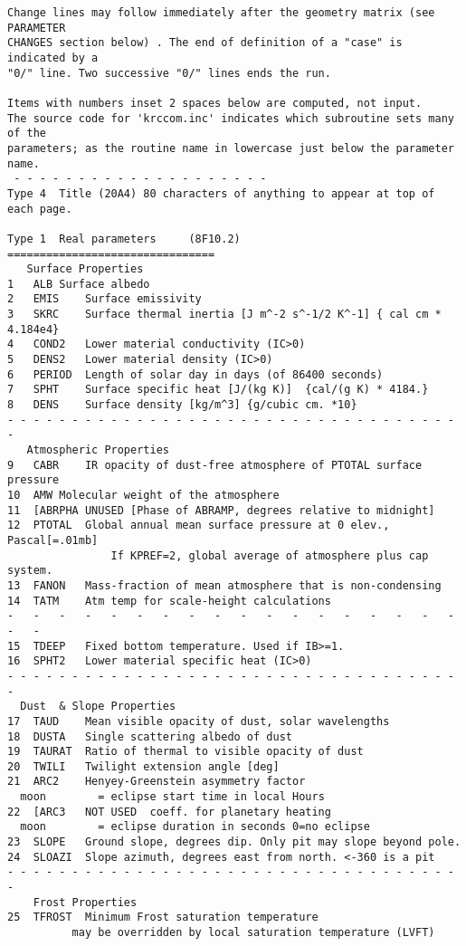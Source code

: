 \begin{verbatim}
Change lines may follow immediately after the geometry matrix (see PARAMETER
CHANGES section below) . The end of definition of a "case" is indicated by a
"0/" line. Two successive "0/" lines ends the run.

Items with numbers inset 2 spaces below are computed, not input.                
The source code for 'krccom.inc' indicates which subroutine sets many of the 
parameters; as the routine name in lowercase just below the parameter name.
 - - - - - - - - - - - - - - - - - - - -
Type 4	Title (20A4) 80 characters of anything to appear at top of each page.

Type 1	Real parameters 	(8F10.2)	================================
   Surface Properties
1	ALB	Surface albedo
2	EMIS	Surface emissivity
3	SKRC	Surface thermal inertia [J m^-2 s^-1/2 K^-1] { cal cm * 4.184e4}
4	COND2	Lower material conductivity (IC>0)
5	DENS2	Lower material density (IC>0)
6	PERIOD	Length of solar day in days (of 86400 seconds)
7	SPHT	Surface specific heat [J/(kg K)]  {cal/(g K) * 4184.}
8	DENS	Surface density [kg/m^3] {g/cubic cm. *10}
- - - - - - - - - - - - - - - - - - - - - - - - - - - - - - - - - - - - 
   Atmospheric Properties
9	CABR	IR opacity of dust-free atmosphere of PTOTAL surface pressure
10	AMW	Molecular weight of the atmosphere
11	[ABRPHA	UNUSED [Phase of ABRAMP, degrees relative to midnight] 
12	PTOTAL	Global annual mean surface pressure at 0 elev., Pascal[=.01mb]
                If KPREF=2, global average of atmosphere plus cap system.
13	FANON	Mass-fraction of mean atmosphere that is non-condensing
14	TATM	Atm temp for scale-height calculations
-   -   -   -   -   -   -   -   -   -   -   -   -   -   -   -   -   -   -   -   
15	TDEEP	Fixed bottom temperature. Used if IB>=1.
16	SPHT2	Lower material specific heat (IC>0)
- - - - - - - - - - - - - - - - - - - - - - - - - - - - - - - - - - - - 
  Dust  & Slope Properties
17	TAUD	Mean visible opacity of dust, solar wavelengths
18	DUSTA	Single scattering albedo of dust
19	TAURAT	Ratio of thermal to visible opacity of dust
20	TWILI	Twilight extension angle [deg]
21	ARC2	Henyey-Greenstein asymmetry factor
  moon        = eclipse start time in local Hours
22	[ARC3	NOT USED  coeff. for planetary heating 
  moon        = eclipse duration in seconds 0=no eclipse
23	SLOPE	Ground slope, degrees dip. Only pit may slope beyond pole.
24	SLOAZI	Slope azimuth, degrees east from north. <-360 is a pit
- - - - - - - - - - - - - - - - - - - - - - - - - - - - - - - - - - - - 
    Frost Properties
25	TFROST	Minimum Frost saturation temperature
		  may be overridden by local saturation temperature (LVFT)

\end{verbatim}
